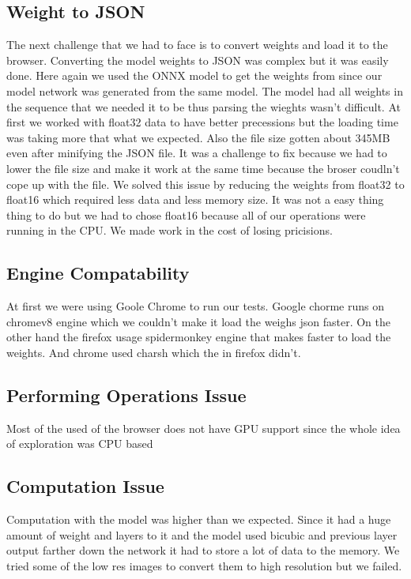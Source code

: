 \documentclass[a4paper,12pt]{article}
\begin{document}
\subsection{Weight to JSON}
The next challenge that we had to face is to convert weights and load it to the browser. Converting the model weights to JSON was complex but it was easily done. Here again we used the ONNX model to get the weights from since our model network was generated from the same model. The model had all weights in the sequence that we needed it to be thus parsing the wieghts wasn't difficult. At first we worked with float32 data to have better precessions but the loading time was taking more that what we expected. Also the file size gotten about 345MB even after minifying the JSON file. It was a challenge to fix because we had to lower the file size and make it work at the same time because the broser coudln't cope up with the file. We solved this issue by reducing the weights from float32 to float16 which required less data and less memory size. It was not a easy thing thing to do but we had to chose float16 because all of our operations were running in the CPU. We made work in the cost of losing pricisions.

\subsection{Engine Compatability}
At first we were using Goole Chrome to run our tests. Google chorme runs on chromev8 engine which we couldn't make it load the weighs json faster. On the other hand the firefox usage spidermonkey engine that makes faster to load the weights. And chrome used charsh which the in firefox didn't.

\subsection{Performing Operations Issue }
Most of the used of the browser does not have GPU support since the whole idea of exploration was CPU based

\subsection{Computation Issue}
Computation with the model was higher than we expected. Since it had a huge amount of weight and layers to it and the model used bicubic and previous layer output farther down the network it had to store a lot of data to the memory. We tried some of the low res images to convert them to high resolution but we failed. 
\end{document}
